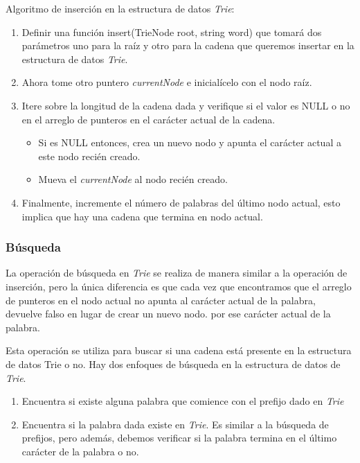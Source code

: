 Algoritmo de inserción en la estructura de datos \emph{Trie}:

\begin{enumerate}
	\item Definir una función insert(TrieNode root, string word) que tomará dos parámetros uno para la raíz y otro para la cadena que queremos insertar en la estructura de datos \emph{Trie}.
	\item Ahora tome otro puntero \emph{currentNode} e inicialícelo con el nodo raíz.
	\item Itere sobre la longitud de la cadena dada y verifique si el valor es NULL o no en el arreglo de punteros en el carácter actual de la cadena.
	\begin{itemize}
		\item Si es NULL entonces, crea un nuevo nodo y apunta el carácter actual a este nodo recién creado.
		\item  Mueva el \emph{currentNode} al nodo recién creado.
	\end{itemize}
	\item Finalmente, incremente el número de palabras del último nodo actual, esto implica que hay una cadena que termina en nodo actual.
	
\end{enumerate}

\subsubsection{Búsqueda}

La operación de búsqueda en \emph{Trie} se realiza de manera similar a la operación de inserción, pero la única diferencia es que cada vez que encontramos que el arreglo de punteros en el nodo actual no apunta al carácter actual de la palabra, devuelve falso en lugar de crear un nuevo nodo. por ese carácter actual de la palabra.

Esta operación se utiliza para buscar si una cadena está presente en la estructura de datos Trie o no. Hay dos enfoques de búsqueda en la estructura de datos de \emph{Trie}.

\begin{enumerate}
	\item Encuentra si existe alguna palabra que comience con el prefijo dado en \emph{Trie}
	\item Encuentra si la palabra dada existe en \emph{Trie}. Es similar a la búsqueda de prefijos, pero además, debemos verificar si la palabra termina en el último carácter de la palabra o no.
\end{enumerate}

